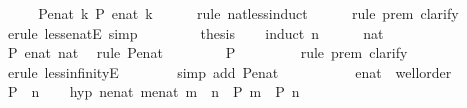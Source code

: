 \begin{isabellebody}
%
\endisadelimproof
%
\isatagproof
{}\isamarkupfalse%
\ {\isacharminus}\isanewline
\ \ \isamarkupfalse%
\ P{\isacharunderscore}enat{\isacharcolon}\ {\isachardoublequoteopen}{\isasymAnd}k{\isachardot}\ P\ {\isacharparenleft}enat\ k{\isacharparenright}{\isachardoublequoteclose}\isanewline
\ \ \ \ \isamarkupfalse%
\ {\isacharparenleft}rule\ nat{\isacharunderscore}less{\isacharunderscore}induct{\isacharparenright}\isanewline
\ \ \ \ \isamarkupfalse%
\ {\isacharparenleft}rule\ prem{\isacharcomma}\ clarify{\isacharparenright}\isanewline
\ \ \ \ \isamarkupfalse%
\ {\isacharparenleft}erule\ less{\isacharunderscore}enatE{\isacharcomma}\ simp{\isacharparenright}\isanewline
\ \ \ \ \isamarkupfalse%
\isanewline
\ \ \isamarkupfalse%
\ {\isacharquery}thesis\isanewline
\ \ \isamarkupfalse%
\ {\isacharparenleft}induct\ n{\isacharparenright}\isanewline
\ \ \ \ \isamarkupfalse%
\ nat\isanewline
\ \ \ \ \isamarkupfalse%
\ {\isachardoublequoteopen}P\ {\isacharparenleft}enat\ nat{\isacharparenright}{\isachardoublequoteclose}\ \isamarkupfalse%
\ {\isacharparenleft}rule\ P{\isacharunderscore}enat{\isacharparenright}\isanewline
\ \ \isamarkupfalse%
\isanewline
\ \ \ \ \isamarkupfalse%
\ {\isachardoublequoteopen}P\ {\isasyminfinity}{\isachardoublequoteclose}\isanewline
\ \ \ \ \ \ \isamarkupfalse%
\ {\isacharparenleft}rule\ prem{\isacharcomma}\ clarify{\isacharparenright}\isanewline
\ \ \ \ \ \ \isamarkupfalse%
\ {\isacharparenleft}erule\ less{\isacharunderscore}infinityE{\isacharparenright}\isanewline
\ \ \ \ \ \ \isamarkupfalse%
\ {\isacharparenleft}simp\ add{\isacharcolon}\ P{\isacharunderscore}enat{\isacharparenright}\isanewline
\ \ \ \ \ \ \isamarkupfalse%
\isanewline
\ \ \isamarkupfalse%
\isanewline
{}\isamarkupfalse%
%
\endisatagproof
{\isafoldproof}%
%
\isadelimproof
\isanewline
%
\endisadelimproof
\isanewline
{}\isamarkupfalse%
\ enat\ {\isacharcolon}{\isacharcolon}\ wellorder\isanewline
%
\isadelimproof
%
\endisadelimproof
%
\isatagproof
{}\isamarkupfalse%
\isanewline
\ \ \isamarkupfalse%
\ P\ \ n\isanewline
\ \ \isamarkupfalse%
\ hyp{\isacharcolon}\ {\isachardoublequoteopen}{\isacharparenleft}{\isasymAnd}n{\isacharcolon}{\isacharcolon}enat{\isachardot}\ {\isacharparenleft}{\isasymAnd}m{\isacharcolon}{\isacharcolon}enat{\isachardot}\ m\ {\isacharless}\ n\ {\isasymLongrightarrow}\ P\ m{\isacharparenright}\ {\isasymLongrightarrow}\ P\ n{\isacharparenright}{\isachardoublequoteclose}\isanewline

\end{isabellebody}
